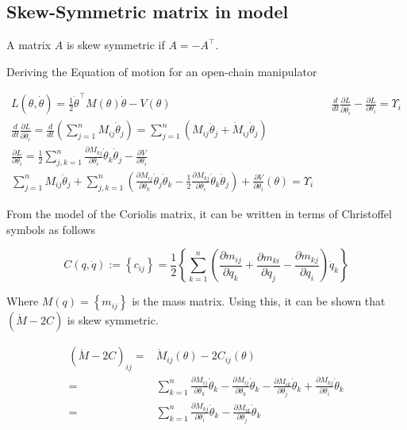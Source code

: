 \subsection{Skew-Symmetric matrix in model}

A matrix $A$ is skew symmetric if $A = -A^\top$. 

Deriving the Equation of motion for an open-chain manipulator

\begin{align}
    L(\theta, \dot{\theta}) = \frac{1}{2} \dot{\theta}^\top M(\theta) \dot{\theta} - V(\theta)
    &&
    \frac{d}{dt} \frac{\partial L}{\partial \dot{\theta}_i} - \frac{\partial L}{\partial \theta_i} = \Upsilon_i
    \nonumber \\
    \frac{d}{dt} \frac{\partial L}{\partial \dot{\theta}_i} = \frac{d}{dt} \left ( \sum_{j=1}^{n} M_{ij} \dot{\theta}_j  \right ) = \sum_{j=1}^{n} \left ( M_{ij} \ddot{\theta}_j + \dot{M}_{ij} \dot{\theta}_j \right )
    \nonumber \\
    \frac{\partial L}{\partial \theta_i} = \frac{1}{2} \sum_{j,k=1}^{n} \frac{\partial M_{kj}}{\partial \theta_i} \dot{\theta}_k \dot{\theta}_j - \frac{\partial V}{\partial \theta_i}
    \nonumber \\
    \sum_{j=1}^{n} M_{ij} \ddot{\theta}_j + \sum_{j,k=1}^{n} \left ( \frac{\partial M_{ij}}{\partial \theta_k} \dot{\theta}_j \dot{\theta}_k - \frac{1}{2} \frac{\partial M_{kj}}{\partial \theta_i} \dot{\theta}_k \dot{\theta}_j \right ) + \frac{\partial V}{\partial \theta_i} (\theta) = \Upsilon_i
\end{align}

From the model of the Coriolis matrix, it can be written in terms of Christoffel symbols as follows

\begin{equation}
    C(q, \dot{q}) := \left \{ c_{ij} \right \} = \frac{1}{2} \left \{ \sum_{k=1}^{n} \left ( \frac{\partial m_{ij}}{\partial q_k} + \frac{\partial m_{ki}}{\partial q_j} - \frac{\partial m_{kj}}{\partial q_i}\right ) \dot{q}_k \right \}
\end{equation}

Where $M(q) = \left \{ m_{ij} \right \}$ is the mass matrix. Using this, it can be shown that $(\dot{M} - 2C)$ is skew symmetric.

\begin{align}
    \left ( \dot{M} - 2C \right )_{ij} =& \dot{M}_{ij} (\theta) - 2 C_{ij} (\theta) \\
    =& \sum_{k=1}^{n} \frac{\partial M_{ij}}{\partial \theta_k} \dot{\theta}_k - \frac{\partial M_{ij}}{\partial \theta_k} \dot{\theta}_k - \frac{\partial M_{ik}}{\partial \theta_j} \dot{\theta}_k + \frac{\partial M_{kj}}{\partial \theta_i} \dot{\theta}_k \\
    =& \sum_{k=1}^{n} \frac{\partial M_{kj}}{\partial \theta_i} \dot{\theta}_k - \frac{\partial M_{ik}}{\partial \theta_j} \dot{\theta}_k
\end{align}

